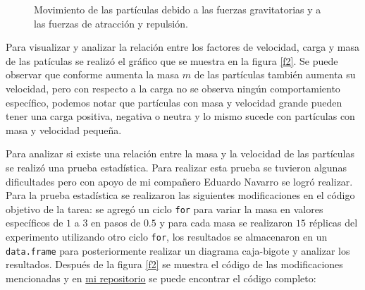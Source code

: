 \documentclass{article}
\begin{document}
\begin{figure}[h!]
\caption{Movimiento de las partículas debido a las fuerzas gravitatorias y a las fuerzas de atracción y repulsión.} 
\label{f1}
\end{figure}

Para visualizar y analizar la relación entre los factores de velocidad, carga y masa de las patículas se realizó el gráfico que se muestra en la figura \ref{f2}. Se puede observar que conforme aumenta la masa $m$ de las partículas también aumenta su velocidad, pero con respecto a la carga no se observa ningún comportamiento específico, podemos notar que partículas con masa y velocidad grande pueden tener una carga positiva, negativa o neutra y lo mismo sucede con partículas con masa y velocidad pequeña.
\bigskip

Para analizar si existe una relación entre la masa y la velocidad de las partículas se realizó una prueba estadística. Para realizar esta prueba se tuvieron algunas dificultades pero con apoyo de mi compañero Eduardo Navarro se logró realizar. Para la prueba estadística se realizaron las siguientes modificaciones en el código objetivo de la tarea: se agregó un ciclo \texttt{for} para variar la masa en valores específicos de $1$ a $3$ en pasos de $0.5$ y para cada masa se realizaron $15$ réplicas del experimento utilizando otro ciclo \texttt{for}, los resultados se almacenaron en un \texttt{data.frame} para posteriormente realizar un diagrama caja-bigote y analizar los resultados. Después de la figura \ref{f2} se muestra el código de las modificaciones mencionadas y en \href{https://github.com/nataliaperez0/Simulation/tree/main/Tarea8}{mi repositorio} se puede encontrar el código completo:
\end{document}
